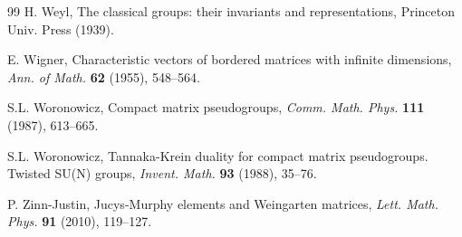 \documentclass[12pt]{amsbook}
\begin{document}
\begin{thebibliography}{99}
H. Weyl, The classical groups: their invariants and representations, Princeton Univ. Press (1939).

E. Wigner, Characteristic vectors of bordered matrices with infinite dimensions, {\em Ann. of Math.} {\bf 62} (1955), 548--564. 

S.L. Woronowicz, Compact matrix pseudogroups, {\em Comm. Math. Phys.} {\bf 111} (1987), 613--665.

S.L. Woronowicz, Tannaka-Krein duality for compact matrix pseudogroups. Twisted SU(N) groups, {\em Invent. Math.} {\bf 93} (1988), 35--76.

P. Zinn-Justin, Jucys-Murphy elements and Weingarten matrices, {\em Lett. Math. Phys.} {\bf 91} (2010), 119--127.

\end{thebibliography}

\baselineskip=14pt

\printindex
\end{document}
